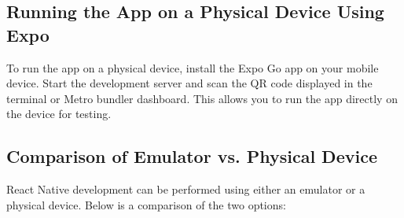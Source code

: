 \documentclass{article}
\begin{document}
\subsection{Running the App on a Physical Device Using Expo}

To run the app on a physical device, install the Expo Go app on your mobile device. Start the development server and scan the QR code displayed in the terminal or Metro bundler dashboard. This allows you to run the app directly on the device for testing.

\subsection{Comparison of Emulator vs. Physical Device}

React Native development can be performed using either an emulator or a physical device. Below is a comparison of the two options:
\end{document}
